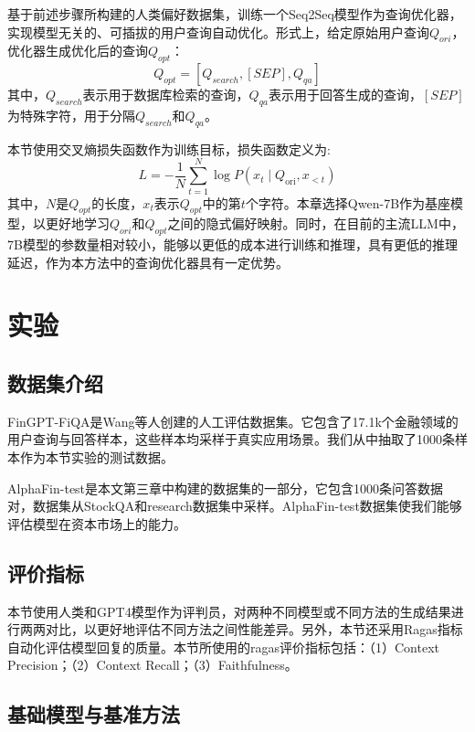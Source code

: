 基于前述步骤所构建的人类偏好数据集，训练一个Seq2Seq模型作为查询优化器，实现模型无关的、可插拔的用户查询自动优化。形式上，给定原始用户查询$Q_{ori}$，优化器生成优化后的查询$Q_{opt}$：
\begin{equation}
	Q_{opt} = [Q_{search}, [SEP], Q_{qa}]
\end{equation}
其中，$Q_{search}$表示用于数据库检索的查询，$Q_{qa}$表示用于回答生成的查询，$[SEP]$为特殊字符，用于分隔$Q_{search}$和$Q_{qa}$。

本节使用交叉熵损失函数作为训练目标，损失函数定义为:
\begin{equation}
	L=-\frac{1}{N} \sum_{t=1}^N \log P\left(x_t \mid Q_{\text{ori}}, x_{<t}\right)
\end{equation}
其中，$N$是$Q_{opt}$的长度，$x_t$表示$Q_{opt}$中的第$t$个字符。本章选择Qwen-7B作为基座模型，以更好地学习$Q_{ori}$和$Q_{opt}$之间的隐式偏好映射。同时，在目前的主流LLM中，7B模型的参数量相对较小，能够以更低的成本进行训练和推理，具有更低的推理延迟，作为本方法中的查询优化器具有一定优势。

\section{实验}

\subsection{数据集介绍}

FinGPT-FiQA\cite{wang2023fingptbenchmark}是Wang等人创建的人工评估数据集。它包含了17.1k个金融领域的用户查询与回答样本，这些样本均采样于真实应用场景。我们从中抽取了1000条样本作为本节实验的测试数据。

AlphaFin-test是本文第三章中构建的数据集的一部分，它包含1000条问答数据对，数据集从StockQA和research数据集中采样。AlphaFin-test数据集使我们能够评估模型在资本市场上的能力。

\subsection{评价指标}

本节使用人类和GPT4模型作为评判员，对两种不同模型或不同方法的生成结果进行两两对比，以更好地评估不同方法之间性能差异。另外，本节还采用Ragas\cite{DBLP:conf/eacl/ESJAS24}指标自动化评估模型回复的质量。本节所使用的ragas评价指标包括：（1）Context Precision；（2）Context Recall；（3）Faithfulness。

\subsection{基础模型与基准方法}

